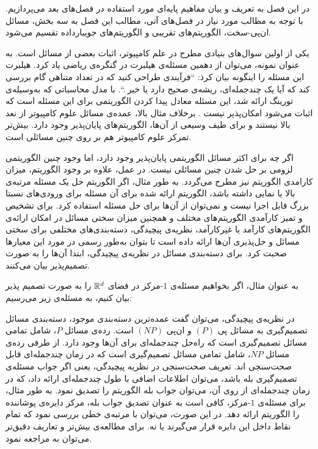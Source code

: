 

در این فصل به تعریف و بیان مفاهیم پایه‌ا‌ی مورد استفاده در فصل‌های بعد می‌پردازیم. با توجه به مطالب مورد نیاز در فصل‌های آتی، مطالب این فصل به سه بخش، مسائل ان‌پی-سخت، الگوریتم‌های تقریبی و الگوریتم‌های جویبارداده تقسیم می‌شود.

یکی از اولین سوال‌های بنیادی مطرح در علم کامپیوتر، اثبات  بعضی از مسائل است. به عنوان نمونه، می‌توان از دهمین مسئله‌ی هیلبرت در گنگره‌ی ریاضی یاد کرد. هیلبرت این مسئله را اینگونه بیان کرذ:‌ ``فرآیندی طراحی کنید که در تعداد متناهی گام بررسی کند که آیا یک چندجمله‌ای، ریشه‌ی صحیح دارد یا خیر .``. با مدل محاسباتی که به‌وسیله‌ی تورینگ ارائه‌ شد، این مسئله معادل پیدا کردن الگوریتمی برای این مسئله است که اثبات می‌شود امکان‌پذیر نیست . برخلاف مثال بالا، عمده‌ی مسائل علوم کامپیوتر از نعد بالا نیستند و برای طیف وسیعی از آن‌ها، الگوریتم‌های پایان‌پذیر وجود دارد. بیش‌تر تمرکز علوم کامپیوتر هم بر روی چنین مسائلی است.

اگر چه برای اکثر مسائل الگوریتمی پایان‌پذیر وجود دارد، اما وجود چنین الگوریتمی لزومی بر حل شدن چنین مسائلی نیست. در عمل، علاوه بر وجود الگوریتم، میزان کارامدی الگوریتم نیز مطرح می‌گردد. به طور مثال، اگر الگوریتم حل یک مسئله مرتبه‌ی بالا یا نمایی داشته باشد، الگوریتم ارائه شده برای آن مسئله برای ورودی‌های نسبتا بزرگ قابل اجرا نیست و نمی‌توان از آن‌ها برای حل مسئله استفاده کرد. برای تشخیص و تمیز کارآمدی الگوریتم‌های مختلف و همچنین میزان سختی مسائل در امکان ارائه‌ی الگوریتم‌های کارآمد یا غیرکارآمد، نظریه‌ی پیچیدگی، دسته‌بندی‌های مختلفی برای سختی مسائل و حل‌پذیری آن‌ها ارائه داده است تا بتوان به‌طور رسمی در مورد این معیار‌ها صحبت کرد. برای دسته‌بندی مسائل در نظریه‌ی پیچیدگی، ابتدا آن‌ها را به صورت تصمیم‌پذیر بیان می‌کنند.


به عنوان مثال، اگر بخواهیم مسئله‌ی $1$-مرکز در فضای $\mathbb{R}^d$ را به صورت تصمیم پذیر بیان کنیم، به مسئله‌ی زیر می‌رسیم:


در نظریه‌ی پیچیدگی، می‌توان گفت عمده‌ترین دسته‌بندی موجود، دسته‌بندی مسائل تصمیم‌گیری به مسائل پی $(P)$ و  ان‌پی $(NP)$ است. رده‌ی مسائل $P$، شامل تمامی مسائل تصمیم‌گیری است که راه‌حل چندجمله‌ای برای آن‌ها وجود دارد. از طرفی رده‌ی مسائل $NP$، شامل تمامی مسائل تصمیم‌گیری است که در زمان چندجمله‌ای قابل صحت‌سنجی اند. تعریف صحت‌سنجی در نظریه پیچیدگی، یعنی اگر جواب مسئله‌ی تصمیم‌گیری بله باشد، می‌توان اطلاعات اضافی با طول چندجمله‌ای ارائه داد، که در زمان چند‌جمله‌ای از روی آن، می‌توان جواب بله الگوریتم را تصدیق نمود. به طور مثال، برای مسئله‌ی $1$-مرکز، کافی است به عنوان تصدیق جواب بله، مرکز دایره‌ی پوشاننده را الگوریتم ارائه دهد. در این صورت، می‌توان با مرتبه‌ی خطی بررسی نمود که تمام نقاط داخل این دایره قرار می‌گیرند یا نه. برای مطالعه‌ی بیش‌تر و تعاریف دقیق‌تر می‌توان به  مراجعه نمود.
